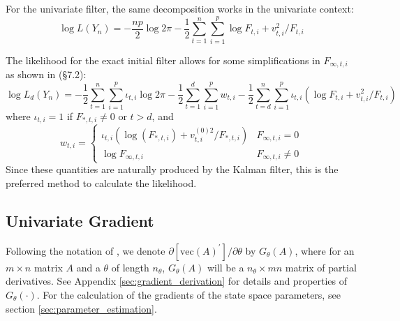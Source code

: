 \documentclass[12pt]{article}
\newcommand{\Gt}{G_\theta}
\newcommand{\vecop}[0]{\text{vec}}
\begin{document}
	For the univariate filter, the same decomposition works in the univariate context:
	\begin{equation} \label{eq:likelihood_uni}
	\log L(Y_n) = -\frac{np}{2} \log 2\pi - \frac{1}{2} \sum_{t=1}^n \sum_{i=1}^p\log F_{t,i}+ v_{t,i}^2 / F_{t,i} 
	\end{equation}
	
	The likelihood for the exact initial filter allows for some simplifications in $F_{\infty,t,i}$ as shown in \cite{dk_book} (\S 7.2):
	\begin{equation} \label{eq:likelihood_uni_diff}
	\log L_d(Y_n) = -\frac{1}{2} \sum_{t=1}^n \sum_{i=1}^p \iota_{t,i} \log 2\pi  - \frac{1}{2}  \sum_{t=1}^d \sum_{i=1}^p w_{t,i} - \frac{1}{2} \sum_{t=d}^n \sum_{i=1}^p \iota_{t,i} \left(\log F_{t,i}+ v_{t,i}^2 / F_{t,i} \right)
	\end{equation}
	where  $\iota_{t,i} = 1$ if $F_{*,t,i} \neq 0$ or $ t > d$, and 
	\begin{equation*}
	w_{t,i} = \begin{cases} 
	   \iota_{t,i} (\log (F_{*,t,i}) + v_{t,i}^{(0)2} / F_{*,t,i}) & F_{\infty,t,i} = 0 \\
	   \log F_{\infty,t,i} & F_{\infty,t,i} \neq 0
	\end{cases} 
	\end{equation*}
	Since these quantities are naturally produced by the Kalman filter, this is the preferred method to calculate the likelihood.

\subsection*{Univariate Gradient}
	Following the notation of \cite{nagakura}, we denote $\partial \left[ \vecop(A)^\prime \right] / \partial \theta$ by $\Gt(A)$, where for an $m \times n$ matrix $A$ and a $\theta$ of length $n_\theta$, $\Gt(A)$ will be a $n_\theta \times mn$ matrix of partial derivatives. See Appendix \ref{sec:gradient_derivation} for details and properties of $\Gt(\cdot)$. For the calculation of the gradients of the state space parameters, see section \ref{sec:parameter_estimation}.
\end{document}
